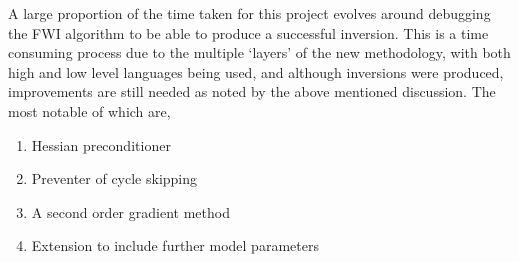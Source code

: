 A large proportion of the time taken for this project evolves around debugging the FWI algorithm to be able to produce a successful inversion. This is a time consuming process due to the multiple `layers' of the new methodology, with both high and low level languages being used, and although inversions were produced, improvements are still needed as noted by the above mentioned discussion. The most notable of which are, 
\begin{enumerate}
\item Hessian preconditioner 
\item Preventer of cycle skipping 
\item A second order gradient method
\item Extension to include further model parameters 
\end{enumerate}


